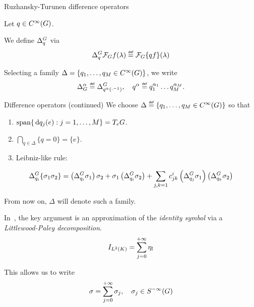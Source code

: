 \documentclass[handout]{beamer}
\begin{document}
\begin{frame}{Ruzhansky-Turunen difference operators}
    \begin{definition}
        Let $q \in {C^\infty(G)}$.

        We define ${\Delta^{G}_{q}}$ via
        \begin{align*}
            \DifferenceOperator q \Fourier f(\lambda)
            \defeq \Fourier \{q f\}(\lambda)
        \end{align*}
    \end{definition}

    \pause

    Selecting a family $\Delta = \{q_1, \dots, q_M \in {C^\infty(G)}\}$,
    we write
    \begin{align*}
        \DifferenceOperatorOrder \alpha \defeq \DifferenceOperator {q^\alpha(\dummy^{-1})},
        \quad q^\alpha \defeq q^{\alpha_1}_1 \dots q^{\alpha_M}_M.
    \end{align*}
\end{frame}

\begin{frame}{Difference operators (continued)}
    We choose $\Delta \defeq \{q_1, \dots, q_M \in \SmoothFunctions \Group\}$ so that
    \begin{enumerate}
        \item
            $\operatorname{span} \{\,\mathrm{d} q_j(e) : j = 1, \dots, M\} = T_e G$.
        \item
            $\bigcap_{q \in \Delta} \{q = 0\} = \{e\}$.
        \item
            Leibniz-like rule:
    \end{enumerate}
    \begin{align*}
        {\Delta^{G}_{q_i}} \{\sigma_1 \sigma_2\}
        =
        \left({\Delta^{G}_{q_i}} \sigma_1 \right) \sigma_2
        + \sigma_1 \left({\Delta^{G}_{q_i}} \sigma_2\right)
        + \sum_{j, k = 1} c^i_{j k} \left({\Delta^{G}_{q_j}} \sigma_1\right) \left({\Delta^{G}_{q_k}} \sigma_2\right)
    \end{align*}

    \pause

    From now on,
    $\Delta$ will denote such a family.
\end{frame}

\begin{frame}
    In~\cite{Fischer2015,FischerRuzhansky16},
    the key argument is an approximation of the \emph{identity symbol} via a \emph{Littlewood-Paley decomposition}.
    \begin{align*}
        {I_{{L^{2} (K)}}} = \sum_{j = 0}^{+ \infty} \eta_l
    \end{align*}

    This allows us to write
    \begin{align*}
        \sigma = \sum_{j = 0}^{+ \infty} \sigma_j,
        \quad
        \sigma_j \in {S^{-\infty} (G)}
    \end{align*}
\end{frame}
\end{document}
